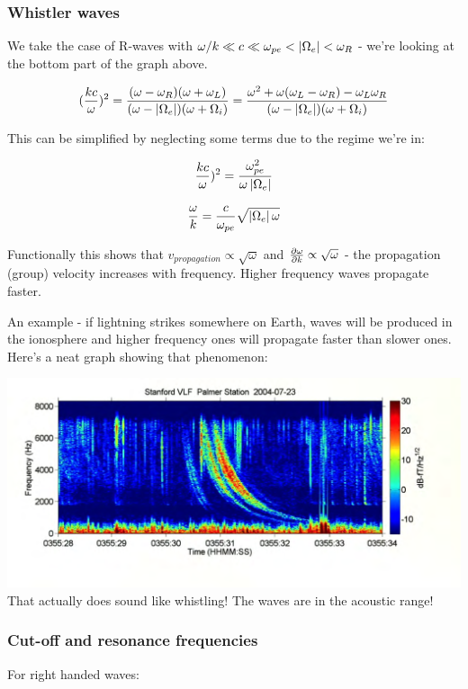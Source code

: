 \documentclass[PlasmaNotes.tex]{subfiles}
\begin{document}
\subsubsection{Whistler waves}

We take the case of R-waves with $\omega / k \ll c \ll \omega_{pe} < \left| \Omega_e \right| < \omega_R$ - we're looking at the bottom part of the graph above.

\[(\frac{k c}{\omega})^2 = \frac{(\omega-\omega_R)(\omega+\omega_L)}{(\omega-\left| \Omega_e \right|)(\omega+\Omega_i)} = \frac{\omega^2 + \omega(\omega_L-\omega_R)-\omega_L\omega_R}{(\omega-\left| \Omega_e \right|)(\omega+\Omega_i)} \]

This can be simplified by neglecting some terms due to the regime we're in:

\[\frac{k c}{\omega})^2 = \frac{\omega_{pe}^2}{\omega \left| \Omega_e \right|} \]

\[ \frac{\omega}{k} = \frac{c}{\omega_{pe}} \sqrt{\left| \Omega_e \right| \omega} \]

Functionally this shows that $v_{propagation} \propto \sqrt{\omega}$ and $\frac{\partial \omega}{\partial k} \propto \sqrt{\omega}$ - the propagation (group) velocity increases with frequency. Higher frequency waves propagate faster.

An example - if lightning strikes somewhere on Earth, waves will be produced in the ionosphere and higher frequency ones will propagate faster than slower ones. Here's a neat graph showing that phenomenon:

\includegraphics[width=\linewidth]{whistlerwaves}
That actually does sound like whistling! The waves are in the acoustic range!

\subsubsection{Cut-off and resonance frequencies}

For right handed waves:
\end{document}
